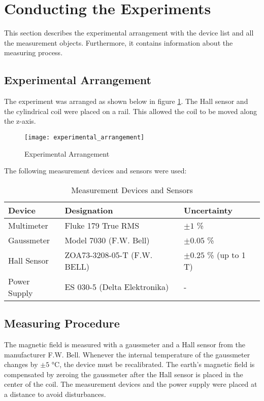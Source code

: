\section{Conducting the Experiments}
\label{sec:Conducting_the_Experiments}
This section describes the experimental arrangement with the device list and all the measurement objects. Furthermore, it contains information about the measuring process.

\subsection{Experimental Arrangement}
\label{subsec:experimental_arrangement}
The experiment was arranged as shown below in figure \ref{fig:experimental_arrangement}. The Hall sensor and the cylindrical coil were placed on a rail. This allowed the coil to be moved along the z-axis.
\begin{figure}[H]
	\centering
	\texttt{[image: experimental\_arrangement]}
	\caption{Experimental Arrangement}
	\label{fig:experimental_arrangement}
\end{figure}

The following measurement devices and sensors were used:

\begin{table}[H]
	\centering
	\renewcommand{\arraystretch}{1.2}
	\begin{tabular}{l l l}
		\hline
		\textbf{Device} & \textbf{Designation} & \textbf{Uncertainty} \\
		\hline
		Multimeter & Fluke 179 True RMS & $\pm1$ \% \\
		Gaussmeter & Model 7030 (F.W. Bell) & $\pm0.05$ \% \\
		Hall Sensor & ZOA73-3208-05-T (F.W. BELL) & $\pm0.25$ \% (up to 1 T) \\
		Power Supply & ES 030-5 (Delta Elektronika) & - \\ \hline
	\end{tabular}
	\caption{Measurement Devices and Sensors}
	\label{tab:measurement_devices_and_sensors}
\end{table}

\subsection{Measuring Procedure}
\label{subsec:measuring_procedure}
The magnetic field is measured with a gaussmeter and a Hall sensor from the manufacturer F.W. Bell. Whenever the internal temperature of the gaussmeter changes by $\pm5$ °C, the device must be recalibrated. The earth's magnetic field is compensated by zeroing the gaussmeter after the Hall sensor is placed in the center of the coil. The measurement devices and the power supply were placed at a distance to avoid disturbances.

